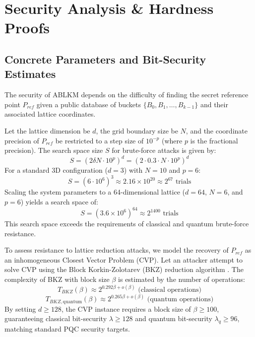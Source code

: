 \documentclass[conference,a4paper]{IEEEtran}
\begin{document}
\section{Security Analysis \& Hardness Proofs}

\subsection{Concrete Parameters and Bit-Security Estimates}
The security of ABLKM depends on the difficulty of finding the secret reference point $P_{ref}$ given a public database of buckets $\{B_0, B_1, \dots, B_{k-1}\}$ and their associated lattice coordinates. 

Let the lattice dimension be $d$, the grid boundary size be $N$, and the coordinate precision of $P_{ref}$ be restricted to a step size of $10^{-p}$ (where $p$ is the fractional precision). The search space size $S$ for brute-force attacks is given by:
\begin{equation}
S = (2\delta N \cdot 10^p)^d = (2 \cdot 0.3 \cdot N \cdot 10^p)^d
\end{equation}
For a standard 3D configuration ($d=3$) with $N=10$ and $p=6$:
\begin{equation}
S = (6 \cdot 10^6)^3 \approx 2.16 \times 10^{20} \approx 2^{67} \text{ trials}
\end{equation}
Scaling the system parameters to a 64-dimensional lattice ($d=64$, $N=6$, and $p=6$) yields a search space of:
\begin{equation}
S = (3.6 \times 10^6)^{64} \approx 2^{1400} \text{ trials}
\end{equation}
This search space exceeds the requirements of classical and quantum brute-force resistance.

To assess resistance to lattice reduction attacks, we model the recovery of $P_{ref}$ as an inhomogeneous Closest Vector Problem (CVP). Let an attacker attempt to solve CVP using the Block Korkin-Zolotarev (BKZ) reduction algorithm \cite{bkz}. The complexity of BKZ with block size $\beta$ is estimated by the number of operations:
\begin{equation}
T_{BKZ}(\beta) \approx 2^{0.292\beta + o(\beta)} \text{ (classical operations)}
\end{equation}
\begin{equation}
T_{BKZ, \text{quantum}}(\beta) \approx 2^{0.265\beta + o(\beta)} \text{ (quantum operations)}
\end{equation}
By setting $d \ge 128$, the CVP instance requires a block size of $\beta \ge 100$, guaranteeing classical bit-security $\lambda \ge 128$ and quantum bit-security $\lambda_{q} \ge 96$, matching standard PQC security targets.
\end{document}
